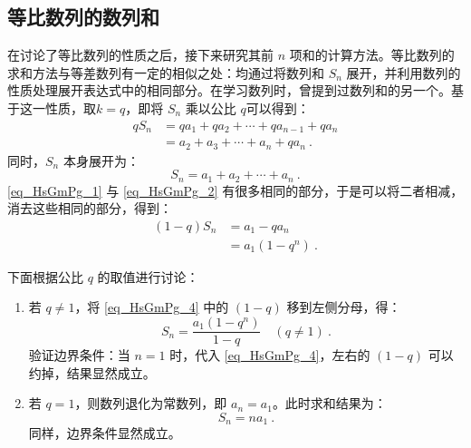 \subsection{等比数列的数列和}

在讨论了等比数列的性质之后，接下来研究其前 $n$ 项和的计算方法。等比数列的求和方法与等差数列有一定的相似之处：均通过将数列和 $S_n$ 展开，并利用数列的性质处理展开表达式中的相同部分。在学习数列时，曾提到过数列和的另一个。基于这一性质，取$k=q$，即将 $S_n$ 乘以公比 $q$可以得到：
\begin{equation}\label{eq_HsGmPg_1}
\begin{aligned}
qS_n &= qa_1 + qa_2 + \cdots + qa_{n-1} + qa_n\\
&= a_2 + a_3 + \cdots + a_n + qa_n~.
\end{aligned}
\end{equation}
同时，$S_n$ 本身展开为：
\begin{equation}\label{eq_HsGmPg_2}
S_n = a_1 + a_2 + \cdots + a_n~.
\end{equation}
\autoref{eq_HsGmPg_1} 与 \autoref{eq_HsGmPg_2} 有很多相同的部分，于是可以将二者相减，消去这些相同的部分，得到：
\begin{equation}\label{eq_HsGmPg_4}
\begin{aligned}
(1 - q)S_n &= a_1 - qa_n \\
&= a_1(1 - q^n)~.
\end{aligned}
\end{equation}

下面根据公比 $q$ 的取值进行讨论：
\begin{enumerate}
\item 若 $q \neq 1$，将 \autoref{eq_HsGmPg_4} 中的 $(1 - q)$ 移到左侧分母，得：
\begin{equation}
S_n = \frac{a_1(1 - q^n)}{1 - q} \quad (q \neq 1)~.
\end{equation}
验证边界条件：当 $n = 1$ 时，代入 \autoref{eq_HsGmPg_4}，左右的 $(1 - q)$ 可以约掉，结果显然成立。
\item 若 $q = 1$，则数列退化为常数列，即 $a_n = a_1$。此时求和结果为：
\begin{equation}
S_n = na_1~.
\end{equation}
同样，边界条件显然成立。
\end{enumerate}

